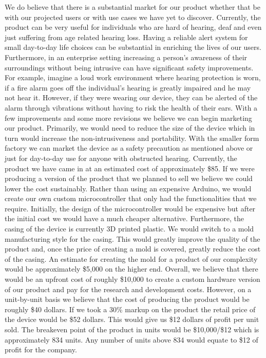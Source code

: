 \documentclass{article}
\begin{document}
We do believe that there is a substantial market for our product whether that be with our projected users or with use cases we have yet to discover. Currently, the product can be very useful for individuals who are hard of hearing, deaf and even just suffering from age related hearing loss. Having a reliable alert system for small day-to-day life choices can be substantial in enriching the lives of our users. Furthermore, in an enterprise setting increasing a person’s awareness of their surroundings without being intrusive can have significant safety improvements. For example, imagine a loud work environment where hearing protection is worn, if a fire alarm goes off the individual's hearing is greatly impaired and he may not hear it. However, if they were wearing our device, they can be alerted of the alarm through vibrations without having to risk the health of their ears.
\newline
\newline With a few improvements and some more revisions we believe we can begin marketing our product. Primarily, we would need to reduce the size of the device which in turn would increase the non-intrusiveness and portability. With the smaller form factory we can market the device as a safety precaution as mentioned above or just for day-to-day use for anyone with obstructed hearing.
\newline
\newline Currently, the product we have came in at an estimated cost of approximately \$85. If we were producing a version of the product that we planned to sell we believe we could lower the cost sustainably. Rather than using an expensive Arduino, we would create our own custom microcontroller that only had the functionalities that we require. Initially, the design of the microcontroller would be expensive but after the initial cost we would have a much cheaper alternative. Furthermore, the casing of the device is currently 3D printed plastic. We would switch to a mold manufacturing style for the casing. This would greatly improve the quality of the product and, once the price of creating a mold is covered, greatly reduce the cost of the casing.  An estimate for creating the mold for a product of our complexity would be approximately \$5,000 on the higher end. Overall, we believe that there would be an upfront cost of roughly \$10,000 to create a custom hardware version of our product and pay for the research and development costs. However, on a unit-by-unit basis we believe that the cost of producing the product would be roughly \$40 dollars. If we took a 30\% markup on the product the retail price of the device would be \$52 dollars. This would give us \$12 dollars of profit per unit sold. The breakeven point of the product in units would be \$10,000/\$12 which is approximately 834 units. Any number of units above 834 would equate to \$12 of profit for the company.
\end{document}
